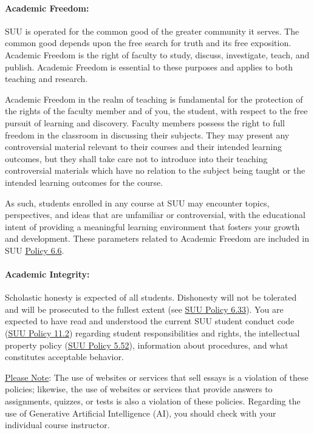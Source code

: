 \documentclass[12pt, letterpaper]{article}
\begin{document}
\paragraph{Academic Freedom:}
SUU is operated for the common good of the greater community it serves. The common good depends upon the free search for truth and its free exposition. Academic Freedom is the right of faculty to study, discuss, investigate, teach, and publish. Academic Freedom is essential to these purposes and applies to both teaching and research. 

\noindent
Academic Freedom in the realm of teaching is fundamental for the protection of the rights of the faculty member and of you, the student, with respect to the free pursuit of learning and discovery. Faculty members possess the right to full freedom in the classroom in discussing their subjects. They may present any controversial material relevant to their courses and their intended learning outcomes, but they shall take care not to introduce into their teaching controversial materials which have no relation to the subject being taught or the intended learning outcomes for the course.

\noindent
As such, students enrolled in any course at SUU may encounter topics, perspectives, and ideas that are unfamiliar or controversial, with the educational intent of providing a meaningful learning environment that fosters your growth and development. These parameters related to Academic Freedom are included in SUU \href{https://www.suu.edu/policies/06/06.html}{Policy 6.6}.

\paragraph{Academic Integrity:}
Scholastic honesty is expected of all students. Dishonesty will not be tolerated and will be prosecuted to the fullest extent (see \href{https://www.suu.edu/policies/06/33.html}{SUU Policy 6.33}). You are expected to have read and understood the current SUU student conduct code (\href{https://www.suu.edu/policies/11/02.html}{SUU Policy 11.2}) regarding student responsibilities and rights, the intellectual property policy (\href{https://www.suu.edu/policies/05/52.html}{SUU Policy 5.52}), information about procedures, and what constitutes acceptable behavior. 

\noindent
\underline{Please Note}: The use of websites or services that sell essays is a violation of these policies; likewise, the use of websites or services that provide answers to assignments, quizzes, or tests is also a violation of these policies. Regarding the use of Generative Artificial Intelligence (AI), you should check with your individual course instructor.
\end{document}
